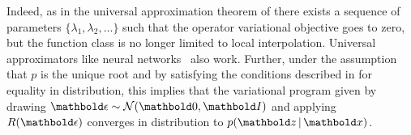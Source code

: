 Indeed, as in
the universal approximation theorem of \citet{tran2016variational}
there exists a sequence of parameters $\{\lambda_1,\lambda_2,\ldots\}$ such that the operator
variational objective goes to zero, but the function class is no longer limited
to local interpolation. Universal approximators like neural networks~\citep{Hornik:1989}
also work. Further, under the assumption that $p$ is the unique root and by
satisfying the conditions described in  for equality in
distribution, this implies that the variational program given by
drawing $\mbepsilon\sim\mathcal{N}(\mb{0},\mbI)$ and applying
$R(\mbepsilon)$ converges in distribution to $p(\mbz\g\mbx)$.
